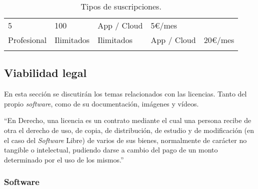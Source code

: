 \begin{longtable}[]{@{}lllll@{}}
\begin{minipage}[t]{0.19\columnwidth}
5\strut
\end{minipage} & \begin{minipage}[t]{0.17\columnwidth}\raggedright\strut
100\strut
\end{minipage} & \begin{minipage}[t]{0.20\columnwidth}\raggedright\strut
App / Cloud\strut
\end{minipage} & \begin{minipage}[t]{0.15\columnwidth}\raggedright\strut
5\euro{}/mes\strut
\end{minipage}\tabularnewline
\begin{minipage}[t]{0.16\columnwidth}\raggedright\strut
Profesional\strut
\end{minipage} & \begin{minipage}[t]{0.19\columnwidth}\raggedright\strut
Ilimitados\strut
\end{minipage} & \begin{minipage}[t]{0.17\columnwidth}\raggedright\strut
Ilimitados\strut
\end{minipage} & \begin{minipage}[t]{0.20\columnwidth}\raggedright\strut
App / Cloud\strut
\end{minipage} & \begin{minipage}[t]{0.15\columnwidth}\raggedright\strut
20\euro{}/mes\strut
\end{minipage}\tabularnewline
\bottomrule
\caption{Tipos de suscripciones.}
\end{longtable}

\subsection{Viabilidad legal}\label{viabilidad-legal}

En esta sección se discutirán los temas relacionados con las licencias.
Tanto del propio \emph{software}, como de su documentación, imágenes y
vídeos.

``En Derecho, una licencia es un contrato mediante el cual una persona
recibe de otra el derecho de uso, de copia, de distribución, de estudio
y de modificación (en el caso del \emph{Software} Libre) de varios de
sus bienes, normalmente de carácter no tangible o intelectual, pudiendo
darse a cambio del pago de un monto determinado por el uso de los
mismos.'' \citep{wiki:licencia}

\subsubsection{Software}\label{software}


